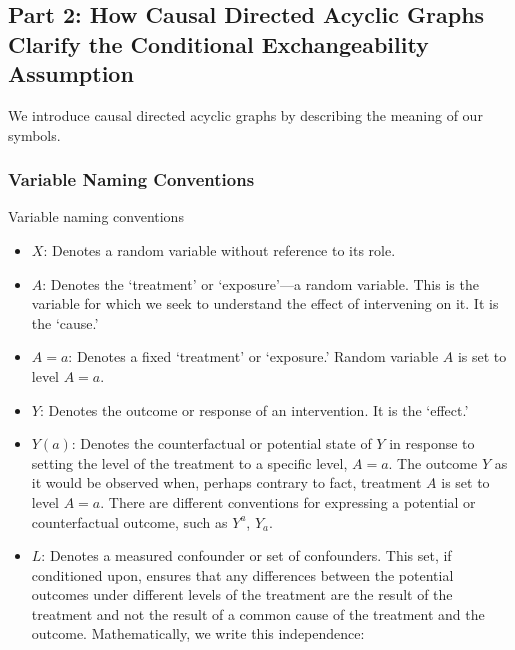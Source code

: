 \documentclass[
  single column]{article}
\begin{document}
\newpage{}

\subsection{Part 2: How Causal Directed Acyclic Graphs Clarify the
Conditional Exchangeability Assumption}\label{id-sec-2}

We introduce causal directed acyclic graphs by describing the meaning of
our symbols.

\subsubsection{Variable Naming
Conventions}\label{variable-naming-conventions}

\begin{table}

\caption{\label{tbl-terminology}Variable naming conventions}

\centering{

\terminologylocalconventionssimple

}

\end{table}%

\begin{itemize}
\item
  \textbf{\(X\)}: Denotes a random variable without reference to its
  role.
\item
  \textbf{\(A\)}: Denotes the `treatment' or `exposure'---a random
  variable. This is the variable for which we seek to understand the
  effect of intervening on it. It is the `cause.'
\item
  \textbf{\(A=a\)}: Denotes a fixed `treatment' or `exposure.' Random
  variable \(A\) is set to level \(A=a\).
\item
  \textbf{\(Y\)}: Denotes the outcome or response of an intervention. It
  is the `effect.'
\item
  \textbf{\(Y(a)\)}: Denotes the counterfactual or potential state of
  \(Y\) in response to setting the level of the treatment to a specific
  level, \(A=a\). The outcome \(Y\) as it would be observed when,
  perhaps contrary to fact, treatment \(A\) is set to level \(A=a\).
  There are different conventions for expressing a potential or
  counterfactual outcome, such as \(Y^a\), \(Y_a\).
\item
  \textbf{\(L\)}: Denotes a measured confounder or set of confounders.
  This set, if conditioned upon, ensures that any differences between
  the potential outcomes under different levels of the treatment are the
  result of the treatment and not the result of a common cause of the
  treatment and the outcome. Mathematically, we write this independence:
\end{itemize}
\end{document}
